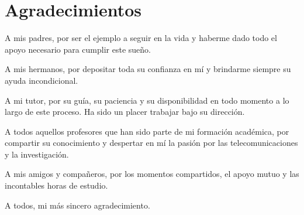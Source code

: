 
\chapter*{Agradecimientos}

A mis padres, por ser el ejemplo a seguir en la vida y haberme dado todo el apoyo necesario para cumplir este sueño.

A mis hermanos, por depositar toda su confianza en mí y brindarme siempre su ayuda incondicional.

A mi tutor, por su guía, su paciencia y su disponibilidad en todo momento a lo largo de este proceso. Ha sido un placer trabajar bajo su dirección.

A todos aquellos profesores que han sido parte de mi formación académica, por compartir su conocimiento y despertar en mí la pasión por las telecomunicaciones y la investigación.

A mis amigos y compañeros, por los momentos compartidos, el apoyo mutuo y las incontables horas de estudio.

A todos, mi más sincero agradecimiento.
